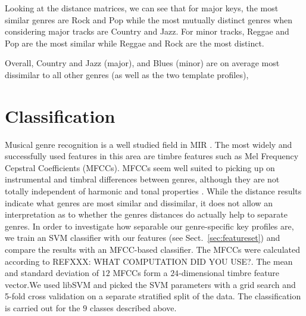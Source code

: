 \documentclass{article}
\begin{document}
Looking at the distance matrices, we can see that for major keys, the most similar genres are Rock and Pop while the most mutually distinct genres when considering major tracks are Country and Jazz. For minor tracks, Reggae and Pop are the most similar while Reggae and Rock are the most distinct.

Overall, Country and Jazz (major), and Blues (minor) are on average most dissimilar to all other genres (as well as the two template profiles), 

\section{Classification}
Musical genre recognition is a well studied field in MIR \cite{fu_survey_2011}. The most widely and successfully used features in this area are timbre features such as Mel Frequency Cepstral Coefficients (MFCCs). MFCCs seem well suited to picking up on instrumental and timbral differences between genres, although they are not totally independent of harmonic and tonal properties \cite{li_genre_2011}.
While the distance results indicate what genres are most similar and dissimilar, it does not allow an interpretation as to whether the genres distances do actually help to separate genres. In order to investigate how separable  our genre-specific key profiles are, we train an SVM classifier with our features (see Sect.~\ref{sec:featureset}) and compare the results with an MFCC-based classifier. The MFCCs were calculated according to REFXXX: WHAT COMPUTATION DID YOU USE?. The mean and standard deviation of $12$ MFCCs form a $24$-dimensional timbre feature vector.We used libSVM  \cite{chang_libsvm:_2011} and picked the SVM parameters with a grid search and 5-fold cross validation on a separate stratified split of the data. The classification is carried out for the $9$ classes described above.
\end{document}
